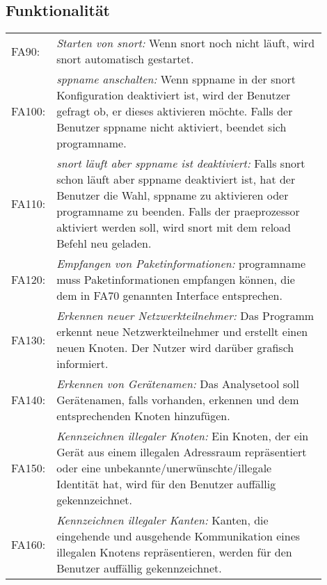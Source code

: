 \subsection{Funktionalität}

\begin{longtable}{lp{0.9\linewidth}}

FA90: & \textit{Starten von \gls{snort}: }Wenn \gls{snort} noch nicht läuft, wird \gls{snort} automatisch gestartet. \\

FA100: & \textit{\gls{sppname} anschalten: }Wenn \gls{sppname} in der \gls{snort} Konfiguration deaktiviert ist, wird der Benutzer gefragt ob, er dieses aktivieren möchte. Falls der Benutzer \gls{sppname} nicht aktiviert, beendet sich \gls{programname}. \\

FA110: & \textit{\gls{snort} läuft aber \gls{sppname} ist deaktiviert: }Falls \gls{snort} schon läuft aber \gls{sppname} deaktiviert ist, hat der Benutzer die Wahl, \gls{sppname} zu aktivieren oder \gls{programname} zu beenden. Falls der \gls{praeprozessor} aktiviert werden soll, wird \gls{snort} mit dem reload Befehl neu geladen.\\

FA120: & \textit{Empfangen von Paketinformationen: }\gls{programname} muss Paketinformationen empfangen können, die dem in FA70 genannten Interface entsprechen. \\

FA130: & \textit{Erkennen neuer Netzwerkteilnehmer: }Das Programm erkennt neue Netzwerkteilnehmer und erstellt einen neuen Knoten. Der Nutzer wird darüber grafisch informiert. \\

FA140: & \textit{Erkennen von Gerätenamen: }Das Analysetool soll Gerätenamen, falls vorhanden, erkennen und dem entsprechenden Knoten hinzufügen. \\

FA150: & \textit{Kennzeichnen illegaler Knoten: }Ein Knoten, der ein Gerät aus einem illegalen Adressraum repräsentiert oder eine unbekannte/unerwünschte/illegale Identität hat, wird für den Benutzer auffällig gekennzeichnet. \\

FA160: & \textit{Kennzeichnen illegaler Kanten: }Kanten, die eingehende und ausgehende Kommunikation eines illegalen Knotens repräsentieren, werden für den Benutzer auffällig gekennzeichnet. \\


\end{longtable}
